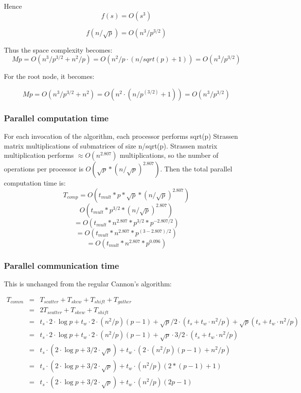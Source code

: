 \documentclass{article}
\begin{document}
Hence
$$f(s) = O(s^3)$$

	
$$f(n/\sqrt{p}) = O(n^3/p^{3/2})$$

Thus the space complexity becomes:
$$Mp = O(n^3/p^{3/2} + n^2/p) = O(n^2/p \cdot (n/sqrt(p)+1)) = O(n^3/p^{3/2})$$

For the root node, it becomes:

$$Mp = O(n^3/p^{3/2} + n^2) = O(n^2 \cdot (n/p^(3/2) + 1)) = O(n^3/p^{3/2})$$


\subsubsection{Parallel computation time}

For each invocation of the algorithm, each processor performs sqrt(p) Strassen
matrix multiplications of submatrices of size n/sqrt(p). Strassen matrix
multiplication performs $\approx O(n^{2.807})$ multiplications, so the number of
operations per processor is $O(\sqrt{p}*(n/\sqrt{p})^{2.807})$. Then the total
parallel computation time is:
$$T_{{comp}} = O(t_{{mult}}*p*\sqrt{p}*(n/\sqrt{p})^{2.807})$$
$$O(t_{{mult}}*p^{3/2}*(n/\sqrt{p})^{2.807})$$
$$= O(t_{{mult}}*n^{2.807} * p^{3/2} * p^{-2.807/2}) $$
$$= O(t_{{mult}} * n^{2.807} * p^{(3-2.807)/2}) $$
$$= O(t_{{mult}} * n^{2.807} * p^{0.096})$$

\subsubsection{Parallel communication time}

This is unchanged from the regular Cannon's algorithm:

\begin{eqnarray*}
T_{{comm}} 	&=& T_{{scatter}} + T_{{skew}} + T_{{shift}} + T_{{gather}} \\
			&=& 2 T_{{scatter}} + T_{{skew}} + T_{{shift}} \\
			&=& t_s \cdot 2 \cdot \log{p} + t_w \cdot 2 \cdot (n^2/p)(p-1) + \sqrt{p}/2 \cdot (t_s + t_w \cdot n^2/p) + \sqrt{p}(t_s + t_w \cdot n^2/p) \\
			&=& t_s \cdot 2 \cdot \log{p} + t_w \cdot 2 \cdot (n^2/p)(p-1) + \sqrt{p} \cdot 3/2 \cdot (t_s + t_w \cdot n^2/p) \\
			&=& t_s \cdot (2 \cdot \log{p} + 3/2 \cdot \sqrt{p}) + t_w \cdot (2 \cdot (n^2/p)(p-1) + n^2/p) \\
			&=& t_s \cdot (2 \cdot \log{p} + 3/2 \cdot \sqrt{p}) + t_w \cdot (n^2/p)(2*(p-1) + 1) \\
			&=& t_s \cdot (2 \cdot \log{p} + 3/2 \cdot \sqrt{p}) + t_w \cdot (n^2/p)(2p-1) \\
\end{eqnarray*}
\end{document}
